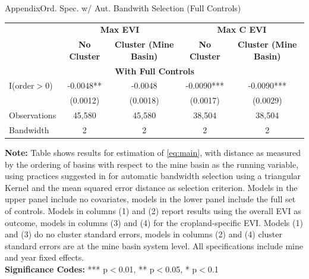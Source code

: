 \documentclass[aspectratio=169,11pt,dvipsnames, handout]{beamer}
\begin{document}
\begin{frame}{\textcolor{defaultclr!30}{Appendix}\hspace{0.75em}Ord. Spec. w/ Aut. Bandwith Selection (Full Controls)}


\centering
\begin{adjustbox}{width=\textwidth}
\begin{tabular}{lcccc}
\toprule
& \multicolumn{2}{c}{\textbf{Max EVI}} & \multicolumn{2}{c}{\textbf{Max C EVI}} \\
\cmidrule(lr){2-3} \cmidrule(lr){4-5}
& \textbf{No Cluster} & \textbf{Cluster (Mine Basin)} & \textbf{No Cluster} & \textbf{Cluster (Mine Basin)} \\
\midrule
\multicolumn{5}{c}{\textbf{With Full Controls}} \\
\midrule
I(order$>$0) & -0.0048** & -0.0048 & -0.0090*** & -0.0090*** \\
& (0.0012) & (0.0018) & (0.0017) & (0.0029) \\
\midrule
Observations & 45,580 & 45,580 & 38,504 & 38,504 \\
Bandwidth & 2 & 2 & 2 & 2 \\
\bottomrule
\end{tabular}
\end{adjustbox}

\vspace{0.5em}

\scriptsize{
\textbf{Note:} Table shows results for estimation of \autoref{eq:main}, with distance as measured by the ordering of basins with respect to the mine basin as the running variable, using practices suggested in \cite{kolesar2018} for automatic bandwidth selection using a triangular Kernel and the mean squared error distance as selection criterion. Models in the upper panel include no covariates, models in the lower panel include the full set of controls. Models in columns (1) and (2) report results using the overall EVI as outcome, models in columns (3) and (4) for the cropland-specific EVI. Models (1) and (3) do no cluster standard errors, models in columns (2) and (4) cluster standard errors are at the mine basin system level. All specifications include mine and year fixed effects. \\
\textbf{Significance Codes:} *** p$<$0.01, ** p$<$0.05, * p$<$0.1 
}

\hyperlink{frame:robust}{} 
\end{frame}







\end{document}
